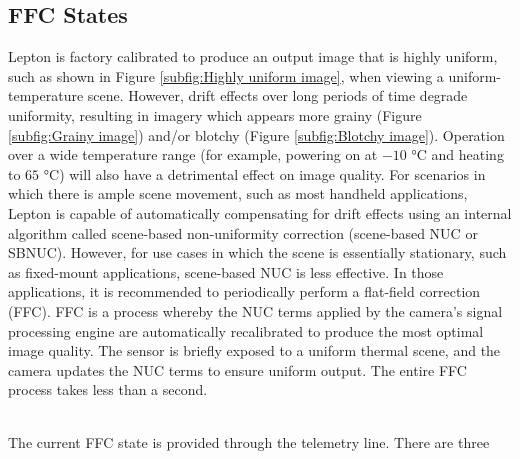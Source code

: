 \subsection{FFC States}
\label{ssec:FFCstates}
Lepton is factory calibrated to produce an output image that is highly uniform,
such as shown in Figure \ref{subfig:Highly uniform image}, when viewing a
uniform-temperature scene. However, drift effects over long periods of time
degrade uniformity, resulting in imagery which appears more grainy (Figure
\ref{subfig:Grainy image}) and/or blotchy (Figure \ref{subfig:Blotchy image}).
Operation over a wide temperature range (for example, powering on at $-10$
\si{\celsius} and heating to $65$ \si{\celsius}) will also have a detrimental
effect on image quality. For scenarios in which there is ample scene movement,
such as most handheld applications, Lepton is capable of automatically
compensating for drift effects using an internal algorithm called scene-based
non-uniformity correction (scene-based NUC or SBNUC). However, for use cases in
which the scene is essentially stationary, such as fixed-mount applications,
scene-based NUC is less effective. In those applications, it is recommended to
periodically perform a flat-field correction (FFC). FFC is a process whereby the
NUC terms applied by the camera's signal processing engine are automatically
recalibrated to produce the most optimal image quality. The sensor is briefly
exposed to a uniform thermal scene, and the camera updates the NUC terms to
ensure uniform output. The entire FFC process takes less than a second.
%
\begin{figure}[htb]
    \centering
     \quad
     \quad
    \label{fig:exampleffc}
\end{figure}
%
\\The current FFC state is provided through the telemetry line. There are three
